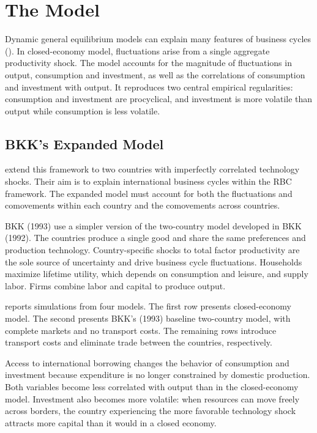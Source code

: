 \section{The Model \label{sec:themodel}}

Dynamic general equilibrium models can explain many features of business cycles (\cite{Prescott:1986aa}). In \cites{Kydland:1982aa} closed-economy model, fluctuations arise from a single aggregate productivity shock. The model accounts for the magnitude of fluctuations in output, consumption and investment, as well as the correlations of consumption and investment with output. It reproduces two central empirical regularities: consumption and investment are procyclical, and investment is more volatile than output while consumption is less volatile.

\subsection{BKK's Expanded Model}
\cite{Backus:1992aa} extend this framework to two countries with imperfectly correlated technology shocks. Their aim is to explain international business cycles within the RBC framework. The expanded model must account for both the fluctuations and comovements within each country and the comovements across countries.

BKK (1993) use a simpler version of the two-country model developed in BKK (1992). The countries produce a single good and share the same preferences and production technology. Country-specific shocks to total factor productivity are the sole source of uncertainty and drive business cycle fluctuations. Households maximize lifetime utility, which depends on consumption and leisure, and supply labor. Firms combine labor and capital to produce output.

 reports simulations from four models. The first row presents \cites{Kydland:1982aa} closed-economy model. The second presents BKK's (1993) baseline two-country model, with complete markets and no transport costs. The remaining rows introduce transport costs and eliminate trade between the countries, respectively.

Access to international borrowing changes the behavior of consumption and investment because expenditure is no longer constrained by domestic production. Both variables become less correlated with output than in the closed-economy model. Investment also becomes more volatile: when resources can move freely across borders, the country experiencing the more favorable technology shock attracts more capital than it would in a closed economy.


